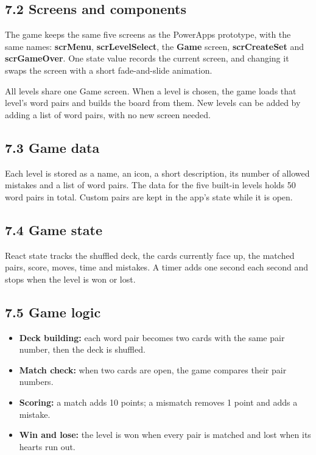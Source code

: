\documentclass[11pt,a4paper]{article}
\begin{document}
\subsection*{7.2 Screens and components}
The game keeps the same five screens as the PowerApps prototype, with the same names: \textbf{scrMenu}, \textbf{scrLevelSelect}, the \textbf{Game} screen, \textbf{scrCreateSet} and \textbf{scrGameOver}. One state value records the current screen, and changing it swaps the screen with a short fade-and-slide animation.

All levels share one Game screen. When a level is chosen, the game loads that level's word pairs and builds the board from them. New levels can be added by adding a list of word pairs, with no new screen needed.

\subsection*{7.3 Game data}
Each level is stored as a name, an icon, a short description, its number of allowed mistakes and a list of word pairs. The data for the five built-in levels holds 50 word pairs in total. Custom pairs are kept in the app's state while it is open.

\subsection*{7.4 Game state}
React state tracks the shuffled deck, the cards currently face up, the matched pairs, score, moves, time and mistakes. A timer adds one second each second and stops when the level is won or lost.

\subsection*{7.5 Game logic}
\begin{itemize}
  \item \textbf{Deck building:} each word pair becomes two cards with the same pair number, then the deck is shuffled.
  \item \textbf{Match check:} when two cards are open, the game compares their pair numbers.
  \item \textbf{Scoring:} a match adds 10 points; a mismatch removes 1 point and adds a mistake.
  \item \textbf{Win and lose:} the level is won when every pair is matched and lost when its hearts run out.
\end{itemize}
\end{document}
